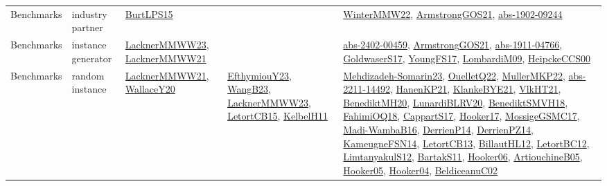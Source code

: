 {\begin{longtable}{lp{3cm}>{\raggedright}p{6cm}>{\raggedright}p{6cm}p{8cm}}
Benchmarks & industry partner & \href{papers/BurtLPS15.pdf}{BurtLPS15}\cite{BurtLPS15} &  & \href{papers/WinterMMW22.pdf}{WinterMMW22}\cite{WinterMMW22}, \href{papers/ArmstrongGOS21.pdf}{ArmstrongGOS21}\cite{ArmstrongGOS21}, \href{articles/abs-1902-09244.pdf}{abs-1902-09244}\cite{abs-1902-09244}\\
Benchmarks & instance generator & \href{articles/LacknerMMWW23.pdf}{LacknerMMWW23}\cite{LacknerMMWW23}, \href{papers/LacknerMMWW21.pdf}{LacknerMMWW21}\cite{LacknerMMWW21} &  & \href{articles/abs-2402-00459.pdf}{abs-2402-00459}\cite{abs-2402-00459}, \href{papers/ArmstrongGOS21.pdf}{ArmstrongGOS21}\cite{ArmstrongGOS21}, \href{articles/abs-1911-04766.pdf}{abs-1911-04766}\cite{abs-1911-04766}, \href{papers/GoldwaserS17.pdf}{GoldwaserS17}\cite{GoldwaserS17}, \href{papers/YoungFS17.pdf}{YoungFS17}\cite{YoungFS17}, \href{papers/LombardiM09.pdf}{LombardiM09}\cite{LombardiM09}, \href{articles/HeipckeCCS00.pdf}{HeipckeCCS00}\cite{HeipckeCCS00}\\
Benchmarks & random instance & \href{papers/LacknerMMWW21.pdf}{LacknerMMWW21}\cite{LacknerMMWW21}, \href{articles/WallaceY20.pdf}{WallaceY20}\cite{WallaceY20} & \href{papers/EfthymiouY23.pdf}{EfthymiouY23}\cite{EfthymiouY23}, \href{papers/WangB23.pdf}{WangB23}\cite{WangB23}, \href{articles/LacknerMMWW23.pdf}{LacknerMMWW23}\cite{LacknerMMWW23}, \href{articles/LetortCB15.pdf}{LetortCB15}\cite{LetortCB15}, \href{articles/KelbelH11.pdf}{KelbelH11}\cite{KelbelH11} & \href{papers/Mehdizadeh-Somarin23.pdf}{Mehdizadeh-Somarin23}\cite{Mehdizadeh-Somarin23}, \href{papers/OuelletQ22.pdf}{OuelletQ22}\cite{OuelletQ22}, \href{articles/MullerMKP22.pdf}{MullerMKP22}\cite{MullerMKP22}, \href{articles/abs-2211-14492.pdf}{abs-2211-14492}\cite{abs-2211-14492}, \href{papers/HanenKP21.pdf}{HanenKP21}\cite{HanenKP21}, \href{papers/KlankeBYE21.pdf}{KlankeBYE21}\cite{KlankeBYE21}, \href{articles/VlkHT21.pdf}{VlkHT21}\cite{VlkHT21}, \href{articles/BenediktMH20.pdf}{BenediktMH20}\cite{BenediktMH20}, \href{articles/LunardiBLRV20.pdf}{LunardiBLRV20}\cite{LunardiBLRV20}, \href{papers/BenediktSMVH18.pdf}{BenediktSMVH18}\cite{BenediktSMVH18}, \href{articles/FahimiOQ18.pdf}{FahimiOQ18}\cite{FahimiOQ18}, \href{papers/CappartS17.pdf}{CappartS17}\cite{CappartS17}, \href{papers/Hooker17.pdf}{Hooker17}\cite{Hooker17}, \href{papers/MossigeGSMC17.pdf}{MossigeGSMC17}\cite{MossigeGSMC17}, \href{papers/Madi-WambaB16.pdf}{Madi-WambaB16}\cite{Madi-WambaB16}, \href{papers/DerrienP14.pdf}{DerrienP14}\cite{DerrienP14}, \href{papers/DerrienPZ14.pdf}{DerrienPZ14}\cite{DerrienPZ14}, \href{articles/KameugneFSN14.pdf}{KameugneFSN14}\cite{KameugneFSN14}, \href{papers/LetortCB13.pdf}{LetortCB13}\cite{LetortCB13}, \href{papers/BillautHL12.pdf}{BillautHL12}\cite{BillautHL12}, \href{papers/LetortBC12.pdf}{LetortBC12}\cite{LetortBC12}, \href{articles/LimtanyakulS12.pdf}{LimtanyakulS12}\cite{LimtanyakulS12}, \href{articles/BartakS11.pdf}{BartakS11}\cite{BartakS11}, \href{articles/Hooker06.pdf}{Hooker06}\cite{Hooker06}, \href{papers/ArtiouchineB05.pdf}{ArtiouchineB05}\cite{ArtiouchineB05}, \href{articles/Hooker05.pdf}{Hooker05}\cite{Hooker05}, \href{papers/Hooker04.pdf}{Hooker04}\cite{Hooker04}, \href{papers/BeldiceanuC02.pdf}{BeldiceanuC02}\cite{BeldiceanuC02}\\

\end{longtable}}
